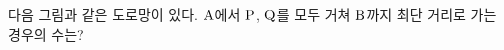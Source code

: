 다음 그림과 같은 도로망이 있다. $\mathrm{A}$에서 $\mathrm{P}$, $\mathrm{Q}$를 모두 거쳐 $\mathrm{B}$까지 최단 거리로 가는 경우의 수는?
\par\smallskip\begin{center}\resizebox{\ifdim\width>\linewidth\linewidth\else\width\fi}{!}{}\end{center}
